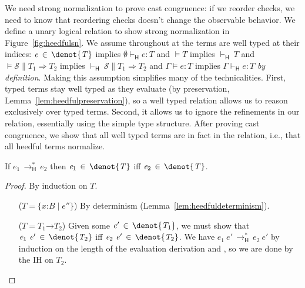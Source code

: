 \documentclass[9pt]{extarticle}
\newcommand{\ottnt}[1]{\mathit{#1}}
\newcommand{\ottsym}[1]{#1}
\begin{document}
{We need strong normalization to prove cast congruence: if we reorder
checks, we need to know that reordering checks doesn't change the
observable behavior. We define a unary logical relation to show strong
normalization in Figure~\ref{fig:heedfulsn}.
We assume throughout at the terms are well
typed at their indices: $\ottnt{e} \, \in \,  \denot{ \ottnt{T} } $ implies $ \emptyset   \vdash _{  \mathsf{H}  }  \ottnt{e}  :  \ottnt{T} $
and $\models  \ottnt{T}$ implies $ \mathord{  \vdash _{  \mathsf{H}  } }~ \ottnt{T} $ and $\models  \mathcal{S}  \mathrel{\parallel}  \ottnt{T_{{\mathrm{1}}}}  \Rightarrow  \ottnt{T_{{\mathrm{2}}}}$ implies
$ \mathord{  \vdash _{  \mathsf{H}  } }~ \mathcal{S}   \mathrel{\parallel}   \ottnt{T_{{\mathrm{1}}}}  \Rightarrow  \ottnt{T_{{\mathrm{2}}}} $ and $\Gamma  \models  \ottnt{e}  \ottsym{:}  \ottnt{T}$ implies $ \Gamma   \vdash _{  \mathsf{H}  }  \ottnt{e}  :  \ottnt{T} $
\textit{by definition}. Making this assumption simplifies many of the
technicalities. First, typed terms stay well typed as they evaluate
(by preservation, Lemma~\ref{lem:heedfulpreservation}), so a well typed relation allows
us to reason exclusively over typed terms. Second, it allows us to
ignore the refinements in our relation, essentially using the simple
type structure.
After proving cast congruence, we show that all well typed terms are
in fact in the relation, i.e., that all heedful terms normalize.

\begin{lemma}
  \label{lem:heedfulsneval}
  If $\ottnt{e_{{\mathrm{1}}}} \,  \longrightarrow ^{*}_{  \mathsf{H}  }  \, \ottnt{e_{{\mathrm{2}}}}$ then $\ottnt{e_{{\mathrm{1}}}} \, \in \,  \denot{ \ottnt{T} } $ iff $\ottnt{e_{{\mathrm{2}}}} \, \in \,  \denot{ \ottnt{T} } $.
\begin{proof}
    By induction on $\ottnt{T}$.
\begin{itemize}
    \item[($\ottnt{T}  \ottsym{=}   \{ \mathit{x} \mathord{:} \ottnt{B} \mathrel{\mid} \ottnt{e''} \} $)] By determinism (Lemma~\ref{lem:heedfuldeterminism}).
    \item[($\ottnt{T}  \ottsym{=}   \ottnt{T_{{\mathrm{1}}}} \mathord{ \rightarrow } \ottnt{T_{{\mathrm{2}}}} $)] Given some $\ottnt{e'} \, \in \,  \denot{ \ottnt{T_{{\mathrm{1}}}} } $, we must show
      that $ \ottnt{e_{{\mathrm{1}}}} ~ \ottnt{e'}  \, \in \,  \denot{ \ottnt{T_{{\mathrm{2}}}} } $ iff $ \ottnt{e_{{\mathrm{2}}}} ~ \ottnt{e'}  \, \in \,  \denot{ \ottnt{T_{{\mathrm{2}}}} } $. We have
      $ \ottnt{e_{{\mathrm{1}}}} ~ \ottnt{e'}  \,  \longrightarrow ^{*}_{  \mathsf{H}  }  \,  \ottnt{e_{{\mathrm{2}}}} ~ \ottnt{e'} $ by induction on the length of the
      evaluation derivation and , so we are done by the IH on
      $\ottnt{T_{{\mathrm{2}}}}$.
    \end{itemize}
  \end{proof}  
\end{lemma}

}
\end{document}
